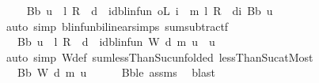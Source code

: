 \begin{isabellebody}
\ \isamarkupfalse%
\ {\isachardoublequoteopen}{\isasymdots}\ {\isacharequal}{\kern0pt}\ B\isactrlsub b\ u\ {\isacharplus}{\kern0pt}\ {\isacharparenleft}{\kern0pt}{\isacharparenleft}{\kern0pt}l\ {\isacharasterisk}{\kern0pt}\isactrlsub R\ {\isasymP}\ d\ {\isacharminus}{\kern0pt}\ id{\isacharunderscore}{\kern0pt}blinfun{\isacharparenright}{\kern0pt}\ o\isactrlsub L\ {\isacharparenleft}{\kern0pt}{\isasymSum}i\ {\isacharless}{\kern0pt}\ m{\isachardot}{\kern0pt}\ {\isacharparenleft}{\kern0pt}l\ {\isacharasterisk}{\kern0pt}\isactrlsub R\ {\isasymP}\ d{\isacharparenright}{\kern0pt}{\isacharcircum}{\kern0pt}{\isacharcircum}{\kern0pt}i{\isacharparenright}{\kern0pt}{\isacharparenright}{\kern0pt}\ {\isacharparenleft}{\kern0pt}B\isactrlsub b\ u{\isacharparenright}{\kern0pt}{\isachardoublequoteclose}\ \isanewline
\ \ \ \ \isamarkupfalse%
\ {\isacharparenleft}{\kern0pt}auto\ simp{\isacharcolon}{\kern0pt}\ blinfun{\isachardot}{\kern0pt}bilinear{\isacharunderscore}{\kern0pt}simps\ sum{\isacharunderscore}{\kern0pt}subtractf{\isacharparenright}{\kern0pt}\isanewline
\ \ \isamarkupfalse%
\ \isamarkupfalse%
\ {\isachardoublequoteopen}{\isasymdots}\ {\isacharequal}{\kern0pt}\ B\isactrlsub b\ u\ {\isacharplus}{\kern0pt}\ {\isacharparenleft}{\kern0pt}l\ {\isacharasterisk}{\kern0pt}\isactrlsub R\ {\isasymP}\ d\ {\isacharminus}{\kern0pt}\ id{\isacharunderscore}{\kern0pt}blinfun{\isacharparenright}{\kern0pt}\ {\isacharparenleft}{\kern0pt}W\ d\ m\ u\ {\isacharminus}{\kern0pt}\ u{\isacharparenright}{\kern0pt}{\isachardoublequoteclose}\isanewline
\ \ \ \ \isamarkupfalse%
\ {\isacharparenleft}{\kern0pt}auto\ simp{\isacharcolon}{\kern0pt}\ W{\isacharunderscore}{\kern0pt}def\ sum{\isachardot}{\kern0pt}lessThan{\isacharunderscore}{\kern0pt}Suc{\isacharbrackleft}{\kern0pt}unfolded\ lessThan{\isacharunderscore}{\kern0pt}Suc{\isacharunderscore}{\kern0pt}atMost{\isacharbrackright}{\kern0pt}{\isacharparenright}{\kern0pt}\isanewline
\ \ \isamarkupfalse%
\ \isamarkupfalse%
\ {\isachardoublequoteopen}{\isasymdots}\ {\isasymle}\ B\isactrlsub b\ {\isacharparenleft}{\kern0pt}W\ d\ m\ u{\isacharparenright}{\kern0pt}{\isachardoublequoteclose}\isanewline
\ \ \ \ \isamarkupfalse%
\ B\isactrlsub b{\isacharunderscore}{\kern0pt}le\ assms{\isacharparenleft}{\kern0pt}{}{\isacharparenright}{\kern0pt}\ \isamarkupfalse%
\ blast\isanewline
\ \ \isamarkupfalse%

\end{isabellebody}
